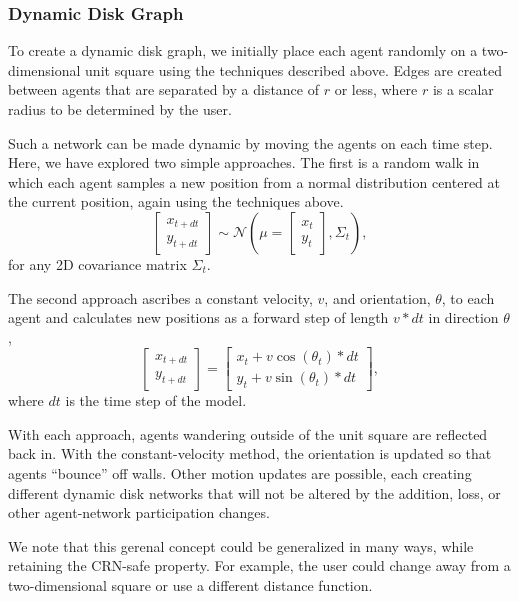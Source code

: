 \documentclass[10pt,letterpaper]{article}
\begin{document}
\subsubsection*{Dynamic Disk Graph}
To create a dynamic disk graph, we initially place each agent randomly on a two-dimensional unit square using the techniques described above. Edges are created between agents that are separated by a distance of $r$ or less, where $r$ is a scalar radius to be determined by the user.

Such a network can be made dynamic by moving the agents on each time step. Here, we have explored two simple approaches. The first is a random walk in which each agent samples a new position from a normal distribution centered at the current position, again using the techniques above.
\begin{equation}
    \begin{bmatrix}x_{t+dt}\\ y_{t+dt} \end{bmatrix} \sim \mathcal{N}\left( \mu=\begin{bmatrix}x_t\\ y_t\end{bmatrix}, \Sigma_t \right),
\end{equation}
for any 2D covariance matrix $\Sigma_t$.

The second approach ascribes a constant velocity, $v$, and orientation, $\theta$, to each agent and calculates new positions as a forward step of length $v * dt$ in direction $\theta$,
\begin{equation}
    \begin{bmatrix}x_{t+dt}\\ y_{t+dt} \end{bmatrix} = \begin{bmatrix}x_t + v \cos(\theta_t) * dt\\ y_t + v \sin(\theta_t) * dt\end{bmatrix},
\end{equation}
where $dt$ is the time step of the model.

With each approach, agents wandering outside of the unit square are reflected back in. With the constant-velocity method, the orientation is updated so that agents ``bounce'' off walls. Other motion updates are possible, each creating different dynamic disk networks that will not be altered by the addition, loss, or other agent-network participation changes.

We note that this gerenal concept could be generalized in many ways, while retaining the CRN-safe property. For example, the user could change away from a two-dimensional square or use a different distance function.
\end{document}

